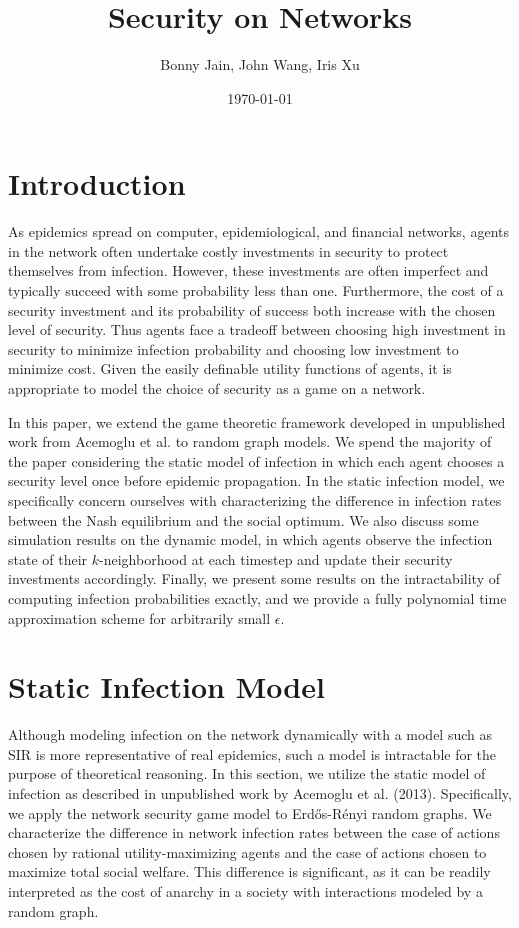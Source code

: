 \documentclass{article}
\title{Security on Networks}
\date{\today}
\author{Bonny Jain, John Wang, Iris Xu}
\theoremstyle{plain}
\begin{document}
  \maketitle

\section{Introduction}

As epidemics spread on computer, epidemiological, and financial networks, agents in the network often undertake costly investments in security to protect themselves from infection. However, these investments are often imperfect and typically succeed with some probability less than one. Furthermore, the cost of a security investment and its probability of success both increase with the chosen level of security. Thus agents face a tradeoff between choosing high investment in security to minimize infection probability and choosing low investment to minimize cost. Given the easily definable utility functions of agents, it is appropriate to model the choice of security as a game on a network.

In this paper, we extend the game theoretic framework developed in unpublished work from Acemoglu et al. to random graph models. We spend the majority of the paper considering the static model of infection in which each agent chooses a security level once before epidemic propagation. In the static infection model, we specifically concern ourselves with characterizing the difference in infection rates between the Nash equilibrium and the social optimum. We also discuss some simulation results on the dynamic model, in which agents observe the infection state of their $k$-neighborhood at each timestep and update their security investments accordingly. Finally, we present some results on the intractability of computing infection probabilities exactly, and we provide a fully polynomial time approximation scheme for arbitrarily small $\epsilon$.

\section{Static Infection Model}

Although modeling infection on the network dynamically with a model such as SIR is more representative of real epidemics, such a model is intractable for the purpose of theoretical reasoning. In this section, we utilize the static model of infection as described in unpublished work by Acemoglu et al. (2013). Specifically, we apply the network security game model to Erd\H{o}s-R\'{e}nyi random graphs. We characterize the difference in network infection rates between the case of actions chosen by rational utility-maximizing agents and the case of actions chosen to maximize total social welfare. This difference is significant, as it can be readily interpreted as the cost of anarchy in a society with interactions modeled by a random graph. 
\end{document}
